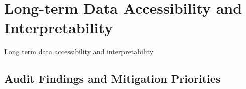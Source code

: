 \documentclass[../main.tex]{subfiles}
\begin{document}
\section{Long-term Data Accessibility and Interpretability}
\label{sec:long-haul}

Long term data accessibility and interpretability~\cite{forum-plugin}

\subsection{Audit Findings and Mitigation Priorities}
\end{document}
